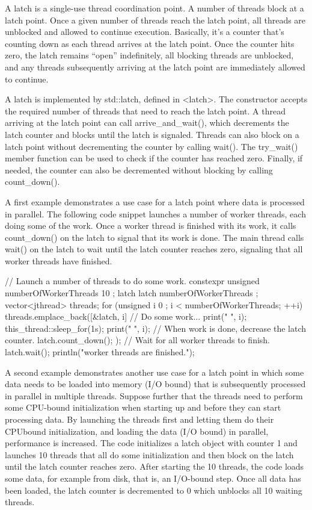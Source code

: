 A latch is a single-use thread coordination point. A number of threads block at a latch point. Once a given number of threads reach the latch point, all threads are unblocked and allowed to continue execution. Basically, it’s a counter that’s counting down as each thread arrives at the latch point. Once the counter hits zero, the latch remains “open” indefinitely, all blocking threads are unblocked, and any threads subsequently arriving at the latch point are immediately allowed to continue.

A latch is implemented by std::latch, defined in <latch>. The constructor accepts the required number of threads that need to reach the latch point. A thread arriving at the latch point can call arrive\_and\_wait(), which decrements the latch counter and blocks until the latch is signaled. Threads can also block on a latch point without decrementing the counter by calling wait(). The try\_wait() member function can be used to check if the counter has reached zero. Finally, if needed, the counter can also be decremented without blocking by calling count\_down().

A first example demonstrates a use case for a latch point where data is processed in parallel. The following code snippet launches a number of worker threads, each doing some of the work. Once a worker thread is finished with its work, it calls count\_down() on the latch to signal that its work is done. The main thread calls wait() on the latch to wait until the latch counter reaches zero, signaling that all worker threads have finished.

\begin{cpp}
// Launch a number of threads to do some work.
constexpr unsigned numberOfWorkerThreads { 10 };
latch latch { numberOfWorkerThreads };
vector<jthread> threads;
for (unsigned i { 0 }; i < numberOfWorkerThreads; ++i) {
    threads.emplace_back([&latch, i] {
        // Do some work...
        print("{} ", i);
        this_thread::sleep_for(1s);
        print("{} ", i);
        // When work is done, decrease the latch counter.
        latch.count_down();
    });
}
// Wait for all worker threads to finish.
latch.wait();
println("\nAll worker threads are finished.");
\end{cpp}

A second example demonstrates another use case for a latch point in which some data needs to be loaded into memory (I/O bound) that is subsequently processed in parallel in multiple threads. Suppose further that the threads need to perform some CPU-bound initialization when starting up and before they can start processing data. By launching the threads first and letting them do their CPUbound initialization, and loading the data (I/O bound) in parallel, performance is increased. The code initializes a latch object with counter 1 and launches 10 threads that all do some initialization and then block on the latch until the latch counter reaches zero. After starting the 10 threads, the code loads some data, for example from disk, that is, an I/O-bound step. Once all data has been loaded, the latch counter is decremented to 0 which unblocks all 10 waiting threads.

